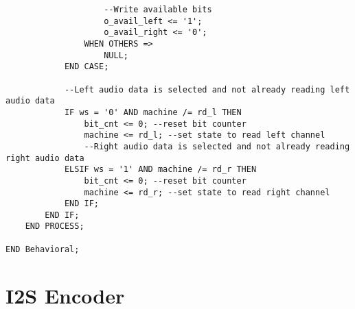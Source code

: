 \begin{lstlisting}
					--Write available bits
					o_avail_left <= '1';
					o_avail_right <= '0';
				WHEN OTHERS => 
					NULL;
			END CASE;

			--Left audio data is selected and not already reading left audio data
			IF ws = '0' AND machine /= rd_l THEN
				bit_cnt <= 0; --reset bit counter 
				machine <= rd_l; --set state to read left channel
				--Right audio data is selected and not already reading right audio data
			ELSIF ws = '1' AND machine /= rd_r THEN
				bit_cnt <= 0; --reset bit counter
				machine <= rd_r; --set state to read right channel
			END IF;
		END IF;
	END PROCESS;

END Behavioral;
\end{lstlisting}

\section*{I2S Encoder}
